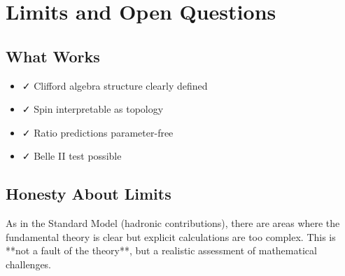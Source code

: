 	\begin{table}[h]
		\centering
		\caption{Standard vs. T0 Dirac formulation}
	\end{table}
	
	\section{Limits and Open Questions}
	
	\subsection{What Works}
	
	\begin{itemize}
		\item ✓ Clifford algebra structure clearly defined
		\item ✓ Spin interpretable as topology
		\item ✓ Ratio predictions parameter-free
		\item ✓ Belle II test possible
	\end{itemize}

	\subsection{Honesty About Limits}
	
	As in the Standard Model (hadronic contributions), there are areas where the fundamental 
	theory is clear but explicit calculations are too complex. This is **not a fault of the 
	theory**, but a realistic assessment of mathematical challenges.
	

